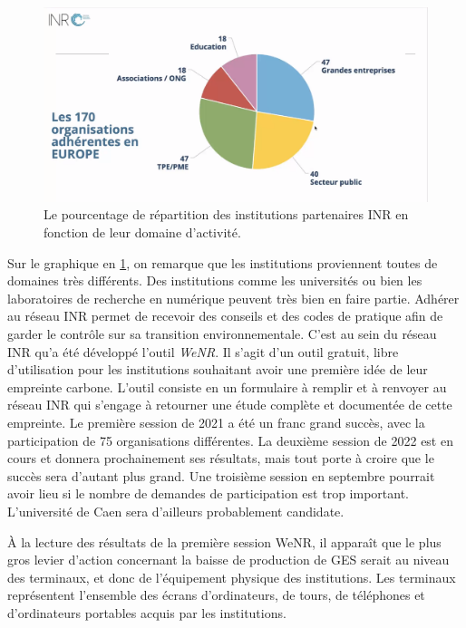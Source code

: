 \documentclass[a4paper,12pt,twoside]{book}
\begin{document}
\begin{figure}[H]
    \centering
    \includegraphics[width=12cm]{img/partie_3/INR_partenaires.png}
    \caption[Le pourcentage de répartition des institutions partenaires INR en fonction de leur domaine d'activité]{Le pourcentage de répartition des institutions partenaires INR en fonction de leur domaine d'activité.\footnotemark}
    \label{camembert}
\end{figure}


Sur le graphique en \ref{camembert}, on remarque que les institutions proviennent toutes de domaines très différents. Des institutions comme les universités ou bien les laboratoires de recherche en numérique peuvent très bien en faire partie. Adhérer au réseau \acrshort{INR} permet de recevoir des conseils et des codes de pratique afin de garder le contrôle sur sa transition environnementale.
C'est au sein du réseau \acrshort{INR} qu'a été développé l'outil \textit{WeNR}. Il s'agit d'un outil gratuit, libre d'utilisation pour les institutions souhaitant avoir une première idée de leur empreinte carbone. L'outil consiste en un formulaire à remplir et à renvoyer au réseau \acrshort{INR} qui s'engage à retourner une étude complète et documentée de cette empreinte. Le première session de 2021 a été un franc grand succès, avec la participation de 75 organisations différentes. La deuxième session de 2022 est en cours et donnera prochainement ses résultats, mais tout porte à croire que le succès sera d'autant plus grand. Une troisième session en septembre pourrait avoir lieu si le nombre de demandes de participation est trop important. L'université de Caen sera d'ailleurs probablement candidate.


À la lecture des résultats de la première session WeNR, il apparaît que le plus gros levier d'action concernant la baisse de production de \acrfull{GES} serait au niveau des terminaux, et donc de l'équipement physique des institutions. Les terminaux représentent l'ensemble des écrans d'ordinateurs, de tours, de téléphones et d'ordinateurs portables acquis par les institutions. 
\end{document}
